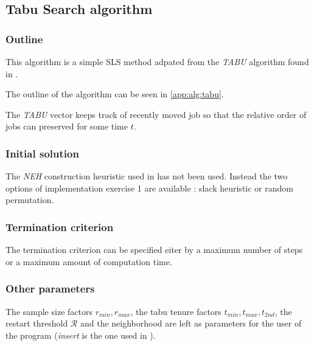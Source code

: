 \subsection{Tabu Search algorithm}
\label{impl:tabu}

\subsubsection{Outline}

This algorithm is a simple SLS method adpated from the \emph{TABU} algorithm found in \cite{santostabu}.

The outline of the algorithm can be seen in \ref{app:alg:tabu}.

The \emph{TABU} vector keeps track of recently moved job so that the relative order of jobs can preserved for some time $t$.

\subsubsection{Initial solution}

The \emph{NEH} construction heuristic used in \cite{santostabu} has not been used. Instead the two options of implementation exercise 1 are available : slack heuristic or random permutation.


\subsubsection{Termination criterion}

The termination criterion can be specified eiter by a maximum number of steps or a maximum amount of computation time.


\subsubsection{Other parameters}

The sample size factors $r_{min}, r_{max}$, the tabu tenure factors $t_{min}, t_{max}, t_{2nd}$, the restart threshold $\mathcal{R}$ and the neighborhood are left as parameters for the user of the program (\emph{insert} is the one used in \cite{santostabu}).
